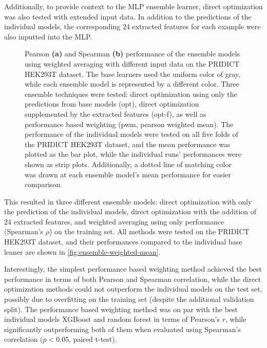 Additionally, to provide context to the MLP ensemble learner, direct optimization was also tested with extended input data. In addition to the predictions of the individual models, the corresponding 24 extracted features for each example were also inputted into the MLP. 

\begin{figure}
    \caption[Ensemble Model Performance]{Pearson \textbf{(a)} and Spearman \textbf{(b)} performance of the ensemble models using weighted averaging with different input data on the PRIDICT HEK293T dataset. The base learners used the uniform color of gray, while each ensemble model is represented by a different color. Three ensemble techniques were tested: direct optimization using only the predictions from base models (opt), direct optimization supplemented by the extracted features (opt-f), as well as performance based weighting (pwm, pearson weighted mean). The performance of the individual models were tested on all five folds of the PRIDICT HEK293T dataset, and the mean performance was plotted as the bar plot, while the individual runs' performances were shown as strip plots. Additionally, a dotted line of matching color was drawn at each ensemble model's mean performance for easier comparison. }
    \label{fig:ensemble-weighted-mean}
\end{figure}

This resulted in three different ensemble models: direct optimization with only the prediction of the individual models, direct optimization with the addition of 24 extracted features, and weighted averaging using only performance (Spearman's $\rho$) on the training set. All methods were tested on the PRIDICT HEK293T dataset, and their performances compared to the individual base leaner are shown in \autoref{fig:ensemble-weighted-mean}.

Interestingly, the simplest performance based weighting method achieved the best performance in terms of both Pearson and Spearman correlation, while the direct optimization methods could not outperform the individual models on the test set, possibly due to overfitting on the training set (despite the additional validation split). The performance based weighting method was on par with the best individual models XGBoost and random forest in terms of Pearson's $r$, while significantly outperforming both of them when evaluated using Spearman's correlation ($p<0.05$, paired t-test). 

